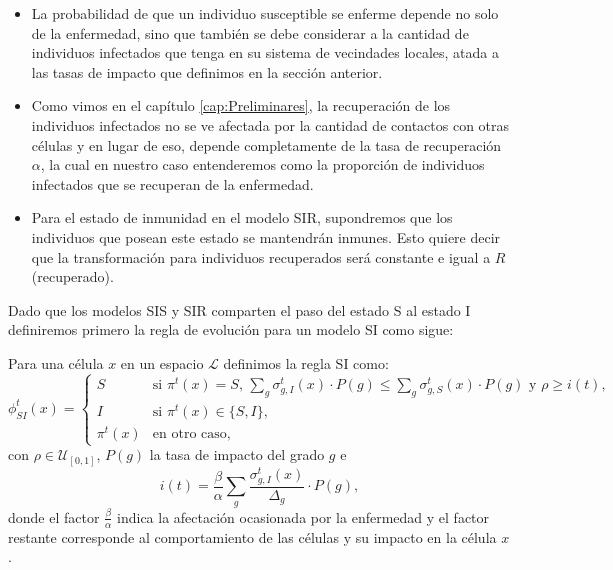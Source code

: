 \begin{itemize}
    \item La probabilidad de que un individuo susceptible se enferme depende no solo de la enfermedad, sino que también se debe considerar a la cantidad de individuos infectados que tenga en su sistema de vecindades locales, atada a las tasas de impacto que definimos en la sección anterior. 
    \item Como vimos en el capítulo \ref{cap:Preliminares}, la recuperación de los individuos infectados no se ve afectada por la cantidad de contactos con otras células y en lugar de eso, depende completamente de la tasa de recuperación $\alpha$, la cual en nuestro caso entenderemos como la proporción de individuos infectados que se recuperan de la enfermedad.
    \item Para el estado de inmunidad en el modelo SIR, supondremos que los individuos que posean este estado se mantendrán inmunes. Esto quiere decir que la transformación para individuos recuperados será constante e igual a $R$ (recuperado).
\end{itemize}

Dado que los modelos SIS y SIR comparten el paso del estado S al estado I definiremos primero la regla de evolución para un modelo SI como sigue:

\begin{definition}\label{def:reglaSI}
Para una célula $x$ en un espacio $\mathcal{L}$ definimos la regla SI como:
\begin{equation}
    \phi_{SI}^t(x)=\left\{\begin{array}{ll}
        S & \text{si }\pi^t(x)=S\text{, }\sum_g{\sigma_{g,I}^t(x)\cdot P(g)}\leq \sum_g{\sigma_{g,S}^t(x)\cdot P(g)}\text{ y }\rho\geq i(t),\\
        I & \text{si }\pi^t(x)\in\{S,I\}\text{,} \\
        \pi^t(x) & \text{en otro caso,}
    \end{array}\right.
\end{equation}
con $\rho\in\mathcal{U}_{[0,1]}$, $P(g)$ la tasa de impacto del grado $g$ e
\begin{equation}
    i(t) = \frac{\beta}{\alpha}\sum_g{\frac{\sigma_{g,I}^t(x)}{\Delta_g}}\cdot P(g),
\end{equation}
donde el factor $\frac{\beta}{\alpha}$ indica la afectación ocasionada por la enfermedad y el factor restante corresponde al comportamiento de las células y su impacto en la célula $x$.
\end{definition}

